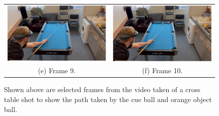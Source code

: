 \documentclass[ %
                author={Finn Alexander Wilkinson},
                supervisor={Dr. Andrew Calway},
                degree={MEng},
                title={\centering A Mixed Reality Aim Assistant for Pool and Snooker},
                subtitle={},
                type={Enterprise},
                year={2021} ]{dissertation}
\begin{document}
\begin{figure}[h!]
\begin{tabular}{cc}
         \includegraphics[scale = 0.15]{Images/Eval/Path Estimate/Cross Table/Frame 9.PNG} & \includegraphics[scale = 0.15]{Images/Eval/Path Estimate/Cross Table/Frame 10.PNG}\\
         (e) Frame 9. & (f) Frame 10.\\
    \end{tabular}
    \caption{Shown above are selected frames from the video taken of a cross table shot to show the path taken by the cue ball and orange object ball.}
    \label{fig:evalCrossTableShot}
\end{figure}
\end{document}
